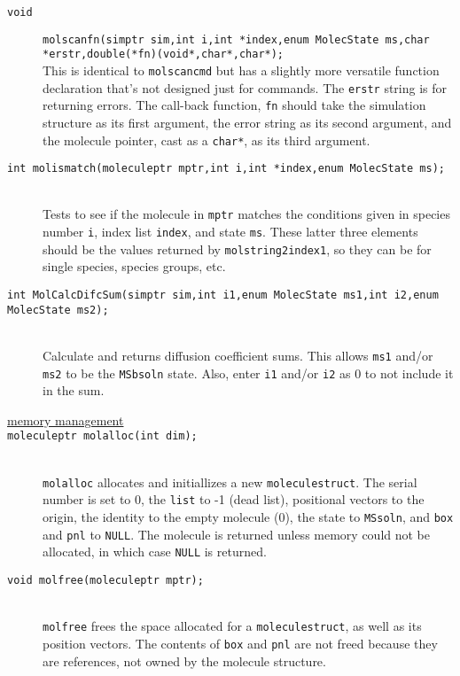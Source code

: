 \documentclass {scrbook}
\newcommand {\ttt} {\texttt}
\begin{document}
\begin{description}
\item[\ttt{void}]
\ttt{molscanfn(simptr sim,int i,int *index,enum MolecState ms,char *erstr,double(*fn)(void*,char*,char*);}
\hfill \\
This is identical to \ttt{molscancmd} but has a slightly more versatile function declaration that's not designed just for commands. The \ttt{erstr} string is for returning errors. The call-back function, \ttt{fn} should take the simulation structure as its first argument, the error string as its second argument, and the molecule pointer, cast as a \ttt{char*}, as its third argument.

\item[\ttt{int molismatch(moleculeptr mptr,int i,int *index,enum MolecState ms);}]
\hfill \\
Tests to see if the molecule in \ttt{mptr} matches the conditions given in species number \ttt{i}, index list \ttt{index}, and state \ttt{ms}. These latter three elements should be the values returned by \ttt{molstring2index1}, so they can be for single species, species groups, etc.

\item[\ttt{int MolCalcDifcSum(simptr sim,int i1,enum MolecState ms1,int i2,enum MolecState ms2);}]
\hfill \\
Calculate and returns diffusion coefficient sums. This allows \ttt{ms1} and/or \ttt{ms2} to be the \ttt{MSbsoln} state. Also, enter \ttt{i1} and/or \ttt{i2} as 0 to not include it in the sum.

\item[\underline{memory management}]

\item[\ttt{moleculeptr molalloc(int dim);}]
\hfill \\
\ttt{molalloc} allocates and initiallizes a new \ttt{moleculestruct}. The serial number is set to 0, the \ttt{list} to -1 (dead list), positional vectors to the origin, the identity to the empty molecule (0), the state to \ttt{MSsoln}, and \ttt{box} and \ttt{pnl} to \ttt{NULL}. The molecule is returned unless memory could not be allocated, in which case \ttt{NULL} is returned.

\item[\ttt{void molfree(moleculeptr mptr);}]
\hfill \\
\ttt{molfree} frees the space allocated for a \ttt{moleculestruct}, as well as its position vectors. The contents of \ttt{box} and \ttt{pnl} are not freed because they are references, not owned by the molecule structure.


\end{description}
\end{document}
